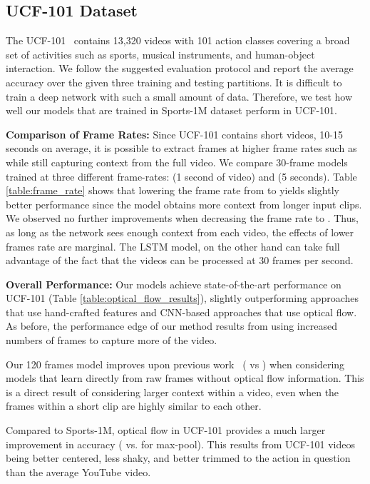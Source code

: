 \documentclass[10pt,twocolumn,letterpaper]{article}
\begin{document}
\vspace{-.6em}
\subsection{UCF-101 Dataset}
\vspace{-.6em}
\label{subsec:ucf-101} The UCF-101~\cite{ucf101} contains 13,320 videos
with 101 action classes covering a broad set of activities such as sports,
musical instruments, and human-object interaction.  We follow the suggested
evaluation protocol and report the average accuracy over the given three
training and testing partitions. It is difficult to train a deep network with
such a small amount of data. Therefore, we test how well our models that are
trained in Sports-1M dataset perform in UCF-101.

\textbf{Comparison of Frame Rates:} Since UCF-101 contains short
videos, 10-15 seconds on average, it is possible to extract frames at
higher frame rates such as  while still capturing context from
the full video. We compare 30-frame models trained at three different
frame-rates:  (1 second of video) and  (5 seconds). Table
\ref{table:frame_rate} shows that lowering the frame rate from  to  yields slightly better performance since the model obtains more context
from longer input clips.  We observed no further improvements when decreasing
the frame rate to . Thus, as long as the network sees enough context
from each video, the effects of lower frames rate are marginal. The LSTM model,
on the other hand can take full advantage of the fact that the videos can be
processed at 30 frames per second.

\textbf{Overall Performance:} Our models achieve state-of-the-art
performance on UCF-101 (Table \ref{table:optical_flow_results}),
slightly outperforming approaches that use hand-crafted features and
CNN-based approaches that use optical flow. As before, the performance
edge of our method results from using increased numbers of frames
to capture more of the video.


Our 120 frames model improves upon previous work~\cite{simonyan2014two} ( vs ) when considering models that learn directly from raw frames
 without optical flow information. This is a direct result of considering larger context within a video, even when the frames within a short clip are
 highly similar to each other.

Compared to Sports-1M, optical flow in UCF-101
provides a much larger improvement in accuracy ( vs.  for max-pool).
This results from UCF-101 videos being better centered, less shaky, and better
trimmed to the action in question than the average YouTube video.
\end{document}
